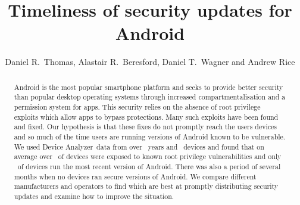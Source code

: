 \documentclass[conference,a4paper,twoside]{IEEEtran}
\author{Daniel R.\ Thomas, Alastair R.\ Beresford, Daniel T.\ Wagner and Andrew Rice}
\newcommand{\da}{Device Analyzer}
\begin{document}
\title{Timeliness of security updates for Android}


\author{
}




\maketitle


\begin{abstract}
Android is the most popular smartphone platform and seeks to provide better security than popular desktop operating systems through increased compartmentalisation and a permission system for apps.
This security relies on the absence of root privilege exploits which allow apps to bypass protections.
Many such exploits have been found and fixed.
Our hypothesis is that these fixes do not promptly reach the users devices and so much of the time users are running versions of Android known to be vulnerable.
We used \da\ data from over \daOSYearsOfData\ years and \daNumOSDevices\ devices and found that on average over \daMeanInsecurityPerc\ of devices were exposed to known root privilege vulnerabilities and only \daUpdatednessPerc\ of devices run the most recent version of Android.
There was also a period of several months when no devices ran secure versions of Android.
We compare different manufacturers and operators to find which are best at promptly distributing security updates and examine how to improve the situation. %
\end{abstract}
\end{document}
